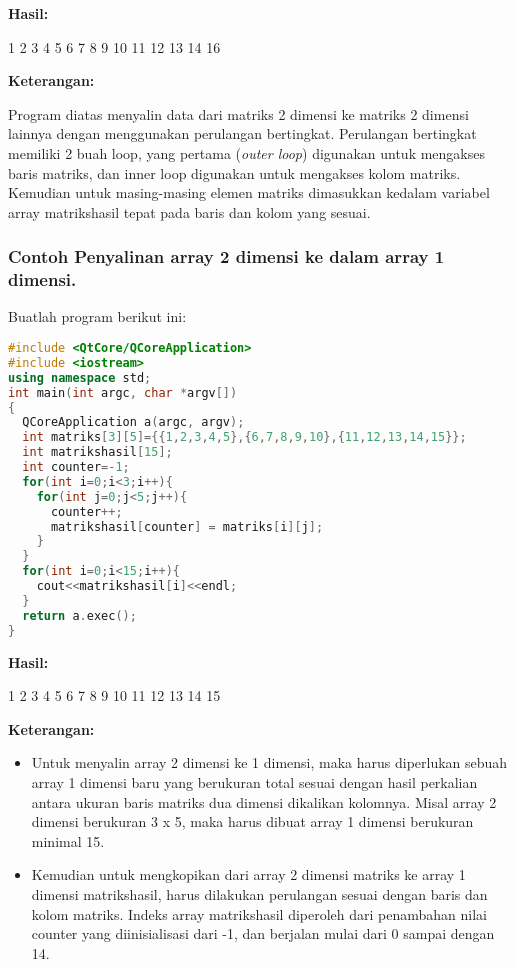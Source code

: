 \textbf{Hasil:}

\begin{lcverbatim}
1	2	3	4	5
6	7	8	9	10
11	12	13	14	16
\end{lcverbatim}

\textbf{Keterangan:}

Program diatas menyalin data dari matriks 2 dimensi ke matriks 2 dimensi
lainnya dengan menggunakan perulangan bertingkat. Perulangan bertingkat
memiliki 2 buah loop, yang pertama (\emph{outer loop}) digunakan untuk
mengakses baris matriks, dan inner loop digunakan untuk mengakses kolom
matriks. Kemudian untuk masing-masing elemen matriks dimasukkan kedalam
variabel array matrikshasil tepat pada baris dan kolom yang sesuai.

\subsubsection*{Contoh  Penyalinan array 2 dimensi ke dalam array 1 dimensi.}

Buatlah program berikut ini:

\begin{lstlisting}[language=c++, caption=Penyalinan array 2 dimensi ke dalam array 1 dimensi, label=contoh3-11]
#include <QtCore/QCoreApplication>
#include <iostream>
using namespace std;
int main(int argc, char *argv[])
{
  QCoreApplication a(argc, argv);
  int matriks[3][5]={{1,2,3,4,5},{6,7,8,9,10},{11,12,13,14,15}};
  int matrikshasil[15];
  int counter=-1;
  for(int i=0;i<3;i++){
    for(int j=0;j<5;j++){
      counter++;
      matrikshasil[counter] = matriks[i][j];
    }
  }
  for(int i=0;i<15;i++){
    cout<<matrikshasil[i]<<endl;
  }
  return a.exec();
}
\end{lstlisting}

\textbf{Hasil:}

\begin{lcverbatim}
1
2
3
4
5
6
7
8
9
10
11
12
13
14
15
\end{lcverbatim}

\textbf{Keterangan:}

\begin{itemize}

\item
  Untuk menyalin array 2 dimensi ke 1 dimensi, maka harus diperlukan
  sebuah array 1 dimensi baru yang berukuran total sesuai dengan hasil
  perkalian antara ukuran baris matriks dua dimensi dikalikan kolomnya.
  Misal array 2 dimensi berukuran 3 x 5, maka harus dibuat array 1
  dimensi berukuran minimal 15.
\item
  Kemudian untuk mengkopikan dari array 2 dimensi matriks ke array 1
  dimensi matrikshasil, harus dilakukan perulangan sesuai dengan baris
  dan kolom matriks. Indeks array matrikshasil diperoleh dari penambahan
  nilai counter yang diinisialisasi dari -1, dan berjalan mulai dari 0
  sampai dengan 14.
\end{itemize}

